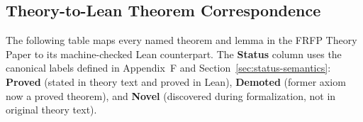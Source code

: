 \subsection*{Theory-to-Lean Theorem Correspondence}
\label{sec:theory_lean_table}

The following table maps every named theorem and lemma in the FRFP Theory Paper
to its machine-checked Lean counterpart.  The \textbf{Status} column uses the
canonical labels defined in Appendix~F and Section~\ref{sec:status-semantics}:
\textbf{Proved} (stated in theory text and proved in Lean),
\textbf{Demoted} (former axiom now a proved theorem), and
\textbf{Novel} (discovered during formalization, not in original theory text).

